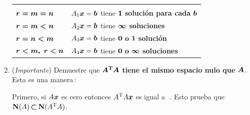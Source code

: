 \documentclass[12pt,a4paper]{article}
\newcommand{\bi}[1]{\hbox{\boldmath$#1$}}
\newcommand\1{\mbox{\,\vrule height-0.8pt depth1.0pt width2pc\,}}
\newcommand\2{\mbox{\,\vrule height-0.8pt depth1.0pt width1pc\,}}
\DeclareRobustCommand\transp{^{\mathrm{T}}}
\begin{document}
\begin{enumerate}
\begin{center}
\begin{tabular}{|p{3cm}l|}\hline
\;&\;\\[-9pt]
$\bi{r=m=n}$&$A_1\bi{x}=\bi{b}$\; tiene $\bi{1}$ \textbf{soluci\'on para cada} $\bi{b}$\\
$\bi{r=m<n}$&$A_2\bi{x}=\bi{b}$\; tiene \textbf{$\bi{\infty}$ soluciones}\\
$\bi{r=n<m}$&$A_3\bi{x}=\bi{b}$\; tiene $\bi{0}$ \textbf{o} $\bi{1}$ \textbf{solución}\\
$\bi{r<m,\; r<n}$&$A_4\bi{x}=\bi{b}$\; tiene $\bi{0}$ \textbf{o} $\bi{\infty}$ \textbf{soluciones}\\[5pt]\hline
\end{tabular}
\end{center}

\item (\emph{Importante}) Demuestre que $\bi{A\transp A}$ \textbf{tiene el mismo espacio nulo que} $\bi{A}$. Esta es una manera\,:


Primero, si $A\bi{x}$ es cero entonces $A\transp A\bi{x}$ es igual a \1. Esto prueba que $\hbox{\textbf{N}}(A)\,\bi{\subset}\,\hbox{\textbf{N}}(A\transp A)$.\linebreak\vspace{-8pt}


\end{enumerate}
\end{document}
